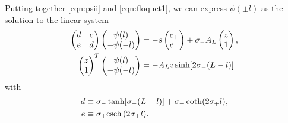 Putting together \eqref{eqn:psii} and \eqref{eqn:floquet1}, we can express $\psi(\pm l)$ as the solution to the linear system
% 
\begin{equation*}
	\begin{split}
	\begin{pmatrix} d&e\\e&d\end{pmatrix}
	\begin{pmatrix} \psi(l)\\ -\psi(-l)\end{pmatrix}
   &=
	-s\begin{pmatrix} c_+ \\ c_- \end{pmatrix}
	 +\sigma_-A_L \begin{pmatrix}z\\1\end{pmatrix},\\
	\begin{pmatrix} z\\ 1\end{pmatrix}^T
  \begin{pmatrix} \psi(l)\\ -\psi(-l)\end{pmatrix} &= -A_Lz\sinh[2\sigma_-(L-l)]
	\end{split}
\end{equation*}
% 
with 
% 
\[
\begin{split}
  d&\equiv \sigma_-\tanh[\sigma_-(L-l)] + \sigma_+\coth(2\sigma_+l),\\
  e&\equiv \sigma_+\mathrm{csch} \,(2\sigma_+l).
\end{split}
\]
% 


